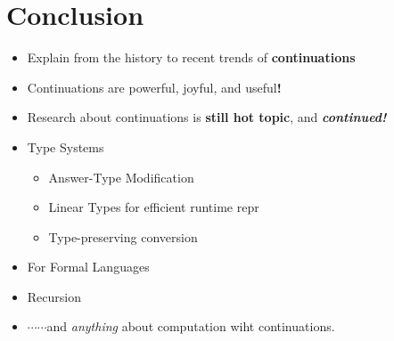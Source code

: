 \section{Conclusion}

\begin{frame}
	\frametitlesec{}
	\vspace*{-.8\baselineskip}

	\begin{tcolorbox}[enhanced,boxrule=1pt,right skip=0pt,left skip=0pt, boxsep=2pt, right = .3em,left = .3em, title={Summary}, colframe=subhighlight,colback=subhighlight!5]
		\footnotesize
		\begin{itemize}
			\setlength\itemsep{-.1\zh}
			\item Explain from the history to recent trends of \textbf{continuations}
			\item Continuations are powerful, joyful, and useful\textbf{!}
			      \vspace*{-.2\baselineskip}

			\item Research about continuations is \textbf{still hot topic}, and {\normalsize\textbf{\textit{continued!}}}
		\end{itemize}
	\end{tcolorbox}

	\begin{tcolorbox}[enhanced,boxrule=1pt,right skip=0pt,left skip=0pt, boxsep=0pt, right = .3em,left = .3em,title={Couldn't talk today \emoji{sob}},colframe=highlight!80,colback=highlight!5]

		\footnotesize
		\begin{itemize}
			\setlength\itemsep{-.1\zh}
			\item Type Systems

			      \begin{itemize}
				      \footnotesize
				      \item Answer-Type Modification
				      \item Linear Types for efficient runtime repr
				      \item Type-preserving conversion
			      \end{itemize}
			\item For Formal Languages
			\item Recursion
			\item $\cdots\cdots$and \textit{anything} about computation wiht continuations.
		\end{itemize}
	\end{tcolorbox}

\end{frame}
